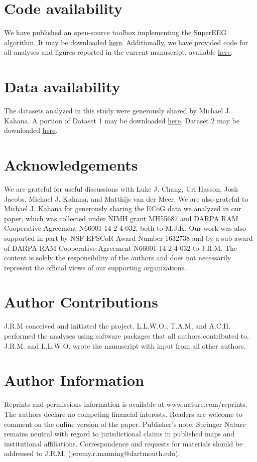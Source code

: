 \documentclass[11pt]{article}
\begin{document}
\section*{Code availability}
We have published an open-source toolbox
implementing the SuperEEG algorithm.  It may be downloaded
\href{https://supereeg.readthedocs.io/en/latest/}{\underline{here}}.
Additionally, we have provided code for all analyses and figures reported in the
current manuscript, available
\href{https://github.com/ContextLab/supereeg_paper}{\underline{here}}.

\section*{Data availability}
The datasets analyzed in this study were generously shared by Michael
J. Kahana.  A portion of Dataset 1 may be downloaded
\href{http://memory.psych.upenn.edu/Request_EEG_access?paper=SedeEtal03}{\underline{here}}.
Dataset 2 may be downloaded
\href{http://memory.psych.upenn.edu/Request_EEG_access?paper=EzzyEtal17}{\underline{here}}.

\section*{Acknowledgements}
We are grateful for useful discussions with Luke J.
Chang, Uri Hasson, Josh Jacobs, Michael J. Kahana, and Matthijs van der Meer.
We are also grateful to Michael J. Kahana for generously sharing the ECoG data
we analyzed in our paper, which was collected under NIMH grant MH55687 and DARPA
RAM Cooperative Agreement N66001-14-2-4-032, both to M.J.K.  Our work was also
supported in part by NSF EPSCoR Award Number 1632738 and by a sub-award of DARPA
RAM Cooperative Agreement N66001-14-2-4-032 to J.R.M.  The content is solely the
responsibility of the authors and does not necessarily represent the official
views of our supporting organizations.

\section*{Author Contributions} J.R.M conceived and initiated the project.
L.L.W.O., T.A.M, and A.C.H. performed the analyses using software packages that
all authors contributed to. J.R.M. and L.L.W.O. wrote the manuscript with input
from all other authors.

\section*{Author Information}
Reprints and permissions information is available
at www.nature.com/reprints.  The authors declare no competing financial
interests.  Readers are welcome to comment on the online version of the paper.
Publisher's note: Springer Nature remains neutral with regard to jurisdictional
claims in published maps and institutional affiliations.  Correspondence and
requests for materials should be addressed to J.R.M.
(jeremy.r.manning@dartmouth.edu).




\clearpage
\end{document}
